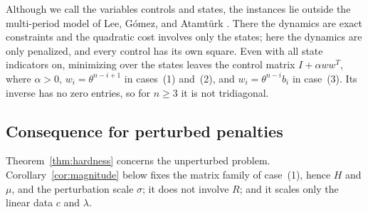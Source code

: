 Although we call the variables controls and states, the instances lie
outside the multi-period model of Lee, G\'omez, and Atamt\"urk
\cite{LeeMultiperiod}. There the dynamics are exact constraints and the
quadratic cost involves only the states; here the dynamics are only
penalized, and every control has its own square. Even with all state
indicators on, minimizing over the states leaves the control matrix
$I+\alpha ww^T$, where $\alpha>0$, $w_i=\theta^{n-i+1}$ in cases~(1)
and~(2), and $w_i=\theta^{n-i}b_i$ in case~(3). Its inverse has no zero
entries, so for $n\ge3$ it is not tridiagonal.

\subsection{Consequence for perturbed penalties}
\label{sec:hardness-perturbed}
Theorem~\ref{thm:hardness} concerns the unperturbed problem.
Corollary~\ref{cor:magnitude} below fixes the matrix family of
case~(1), hence $H$ and $\mu$, and the perturbation scale $\sigma$; it
does not involve $R$; and it scales only the linear data $c$ and
$\lambda$.

